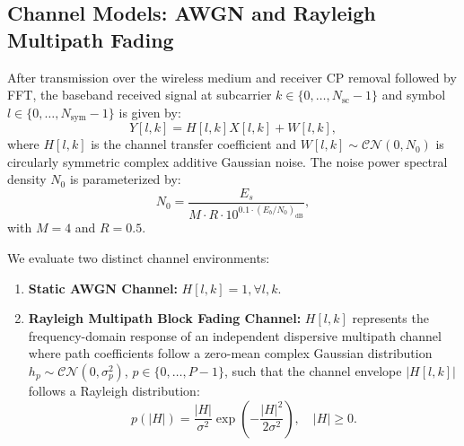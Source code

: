 \documentclass[journal]{IEEEtran}
\begin{document}
\subsection{Channel Models: AWGN and Rayleigh Multipath Fading}
After transmission over the wireless medium and receiver CP removal followed by FFT, the baseband received signal at subcarrier $k \in \{0, \dots, N_{\text{sc}}-1\}$ and symbol $l \in \{0, \dots, N_{\text{sym}}-1\}$ is given by:
\begin{equation}
    Y[l, k] = H[l, k] X[l, k] + W[l, k],
\end{equation}
where $H[l, k]$ is the channel transfer coefficient and $W[l, k] \sim \mathcal{CN}(0, N_0)$ is circularly symmetric complex additive Gaussian noise. The noise power spectral density $N_0$ is parameterized by:
\begin{equation}
    N_0 = \frac{E_s}{M \cdot R \cdot 10^{0.1 \cdot (E_b/N_0)_{\text{dB}}}},
\end{equation}
with $M = 4$ and $R = 0.5$.

We evaluate two distinct channel environments:
\begin{enumerate}
    \item \textbf{Static AWGN Channel:} $H[l, k] = 1, \forall l, k$.
    \item \textbf{Rayleigh Multipath Block Fading Channel:} $H[l, k]$ represents the frequency-domain response of an independent dispersive multipath channel where path coefficients follow a zero-mean complex Gaussian distribution $h_p \sim \mathcal{CN}(0, \sigma_p^2)$, $p \in \{0, \dots, P-1\}$, such that the channel envelope $|H[l, k]|$ follows a Rayleigh distribution:
    \begin{equation}
        p(|H|) = \frac{|H|}{\sigma^2} \exp\left( -\frac{|H|^2}{2\sigma^2} \right), \quad |H| \ge 0.
    \end{equation}
\end{enumerate}
\end{document}
